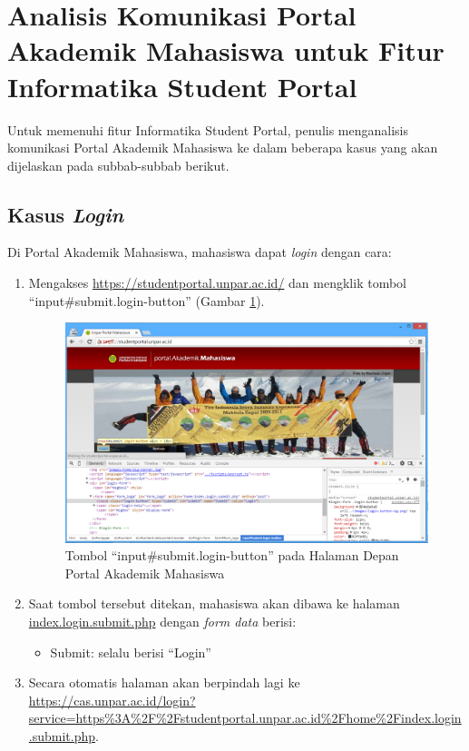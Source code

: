 \section{Analisis Komunikasi Portal Akademik Mahasiswa untuk Fitur Informatika Student Portal}
Untuk memenuhi fitur Informatika Student Portal, penulis menganalisis komunikasi Portal Akademik Mahasiswa ke dalam beberapa kasus yang akan dijelaskan pada subbab-subbab berikut.

\subsection{Kasus \textit{Login}}
Di Portal Akademik Mahasiswa, mahasiswa dapat \textit{login} dengan cara:
\begin{enumerate}
	\item Mengakses \url{https://studentportal.unpar.ac.id/} dan mengklik tombol ``input\#submit.login-button'' (Gambar \ref{fig:3_case_login}).
	\begin{figure}[H]
			\centering
			\includegraphics[scale=0.5]{Gambar/case-login}
			\caption{Tombol ``input\#submit.login-button'' pada Halaman Depan Portal Akademik Mahasiswa} 
			\label{fig:3_case_login}
		\end{figure}
		
	\item Saat tombol tersebut ditekan, mahasiswa akan dibawa ke halaman \url{index.login.submit.php} dengan \textit{form data} berisi:
			\begin{itemize}
				\item Submit: selalu berisi ``Login''
			\end{itemize}
		
	\item Secara otomatis halaman akan berpindah lagi ke \url{https://cas.unpar.ac.id/login? service=https\%3A\%2F\%2Fstudentportal.unpar.ac.id\%2Fhome\%2Findex.login.submit.php}.
		

\end{enumerate}
